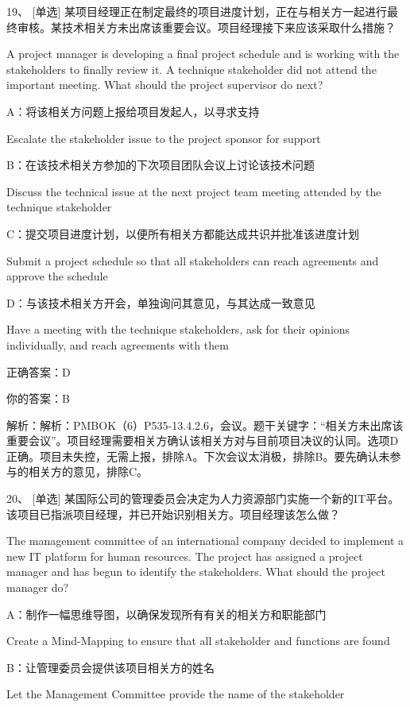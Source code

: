 19、 [单选] 某项目经理正在制定最终的项目进度计划，正在与相关方一起进行最终审核。某技术相关方未出席该重要会议。项目经理接下来应该采取什么措施？

A project manager is developing a final project schedule and is working with the stakeholders to finally review it. A technique stakeholder did not attend the important meeting. What should the project supervisor do next?

A：将该相关方问题上报给项目发起人，以寻求支持

Escalate the stakeholder issue to the project sponsor for support

B：在该技术相关方参加的下次项目团队会议上讨论该技术问题

Discuss the technical issue at the next project team meeting attended by the technique stakeholder

C：提交项目进度计划，以便所有相关方都能达成共识并批准该进度计划

Submit a project schedule so that all stakeholders can reach agreements and approve the schedule

D：与该技术相关方开会，单独询问其意见，与其达成一致意见

Have a meeting with the technique stakeholders, ask for their opinions individually, and reach agreements with them

正确答案：D

你的答案：B

解析：解析：PMBOK（6）P535-13.4.2.6，会议。题干关键字：“相关方未出席该重要会议”。项目经理需要相关方确认该相关方对与目前项目决议的认同。选项D正确。项目未失控，无需上报，排除A。下次会议太消极，排除B。要先确认未参与的相关方的意见，排除C。

20、 [单选] 某国际公司的管理委员会决定为人力资源部门实施一个新的IT平台。该项目已指派项目经理，并已开始识别相关方。项目经理该怎么做？

The management committee of an international company decided to implement a new IT platform for human resources. The project has assigned a project manager and has begun to identify the stakeholders. What should the project manager do?

A：制作一幅思维导图，以确保发现所有有关的相关方和职能部门

Create a Mind-Mapping to ensure that all stakeholder and functions are found

B：让管理委员会提供该项目相关方的姓名

Let the Management Committee provide the name of the stakeholder

